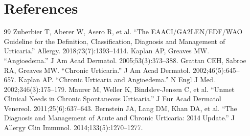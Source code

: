 \section*{References}
\begin{thebibliography}{99}
 Zuberbier T, Aberer W, Asero R, et al. ``The EAACI/GA2LEN/EDF/WAO Guideline for the Definition, Classification, Diagnosis and Management of Urticaria.'' Allergy. 2018;73(7):1393--1414.
 Kaplan AP, Greaves MW. ``Angioedema.'' J Am Acad Dermatol. 2005;53(3):373--388.
 Grattan CEH, Sabroe RA, Greaves MW. ``Chronic Urticaria.'' J Am Acad Dermatol. 2002;46(5):645--657.
 Kaplan AP. ``Chronic Urticaria and Angioedema.'' N Engl J Med. 2002;346(3):175--179.
 Maurer M, Weller K, Bindslev-Jensen C, et al. ``Unmet Clinical Needs in Chronic Spontaneous Urticaria.'' J Eur Acad Dermatol Venereol. 2011;25(6):637--643.
 Bernstein JA, Lang DM, Khan DA, et al. ``The Diagnosis and Management of Acute and Chronic Urticaria: 2014 Update.'' J Allergy Clin Immunol. 2014;133(5):1270--1277.
\end{thebibliography}
